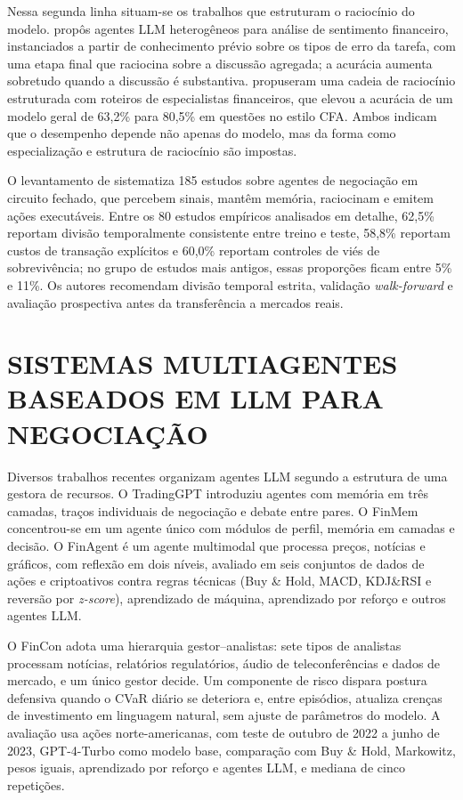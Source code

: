 Nessa segunda linha situam-se os trabalhos que estruturam o raciocínio do modelo. \citet{Xing2024} propôs agentes LLM heterogêneos para análise de sentimento financeiro, instanciados a partir de conhecimento prévio sobre os tipos de erro da tarefa, com uma etapa final que raciocina sobre a discussão agregada; a acurácia aumenta sobretudo quando a discussão é substantiva. \citet{FinCoT2025} propuseram uma cadeia de raciocínio estruturada com roteiros de especialistas financeiros, que elevou a acurácia de um modelo geral de 63,2\% para 80,5\% em questões no estilo CFA. Ambos indicam que o desempenho depende não apenas do modelo, mas da forma como especialização e estrutura de raciocínio são impostas.

O levantamento de \citet{Xia2026} sistematiza 185 estudos sobre agentes de negociação em circuito fechado, que percebem sinais, mantêm memória, raciocinam e emitem ações executáveis. Entre os 80 estudos empíricos analisados em detalhe, 62,5\% reportam divisão temporalmente consistente entre treino e teste, 58,8\% reportam custos de transação explícitos e 60,0\% reportam controles de viés de sobrevivência; no grupo de estudos mais antigos, essas proporções ficam entre 5\% e 11\%. Os autores recomendam divisão temporal estrita, validação \textit{walk-forward} e avaliação prospectiva antes da transferência a mercados reais.

\section{SISTEMAS MULTIAGENTES BASEADOS EM LLM PARA NEGOCIAÇÃO}
\label{sec:rel-mas}

Diversos trabalhos recentes organizam agentes LLM segundo a estrutura de uma gestora de recursos. O TradingGPT \citep{Li2023} introduziu agentes com memória em três camadas, traços individuais de negociação e debate entre pares. O FinMem \citep{FinMem2024} concentrou-se em um agente único com módulos de perfil, memória em camadas e decisão. O FinAgent \citep{FinAgent2024} é um agente multimodal que processa preços, notícias e gráficos, com reflexão em dois níveis, avaliado em seis conjuntos de dados de ações e criptoativos contra regras técnicas (Buy \& Hold, MACD, KDJ\&RSI e reversão por \textit{z-score}), aprendizado de máquina, aprendizado por reforço e outros agentes LLM.

O FinCon \citep{FinCon2024} adota uma hierarquia gestor--analistas: sete tipos de analistas processam notícias, relatórios regulatórios, áudio de teleconferências e dados de mercado, e um único gestor decide. Um componente de risco dispara postura defensiva quando o CVaR diário se deteriora e, entre episódios, atualiza crenças de investimento em linguagem natural, sem ajuste de parâmetros do modelo. A avaliação usa ações norte-americanas, com teste de outubro de 2022 a junho de 2023, GPT-4-Turbo como modelo base, comparação com Buy \& Hold, Markowitz, pesos iguais, aprendizado por reforço e agentes LLM, e mediana de cinco repetições.

